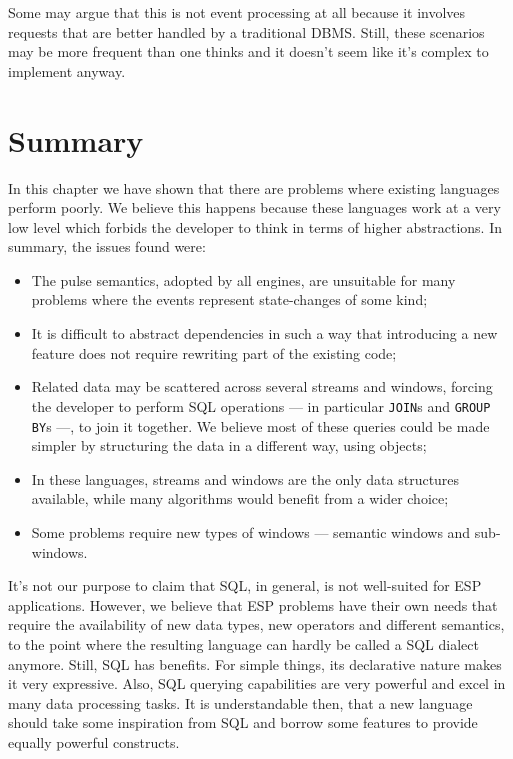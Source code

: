 \documentclass[a4,11pt]{report}
\begin{document}
Some may argue that this is not event processing at all because it
involves requests that are better handled by a traditional
DBMS. Still, these scenarios may be more frequent than one thinks and
it doesn't seem like it's complex to implement anyway.

\section{Summary}

In this chapter we have shown that there are problems where existing
languages perform poorly. We believe this happens because these
languages work at a very low level which forbids the developer to
think in terms of higher abstractions. In summary, the issues found
were:

\begin{itemize}
\item The pulse semantics, adopted by all engines, are unsuitable for
  many problems where the events represent state-changes of some kind;
\item It is difficult to abstract dependencies in such a way that
  introducing a new feature does not require rewriting part of the
  existing code;
\item Related data may be scattered across several streams and
  windows, forcing the developer to perform SQL operations --- in
  particular \verb=JOIN=s and \verb=GROUP BY=s ---, to join it
  together. We believe most of these queries could be made simpler by
  structuring the data in a different way, using objects;
\item In these languages, streams and windows are the only data
  structures available, while many algorithms would benefit from a
  wider choice;
\item Some problems require new types of windows --- semantic windows
  and sub-windows.

\end{itemize}

It's not our purpose to claim that SQL, in general, is not well-suited
for ESP applications. However, we believe that ESP problems have their
own needs that require the availability of new data types, new
operators and different semantics, to the point where the resulting
language can hardly be called a SQL dialect anymore. Still, SQL has
benefits. For simple things, its declarative nature makes it very
expressive. Also, SQL querying capabilities are very powerful and
excel in many data processing tasks. It is understandable then, that a
new language should take some inspiration from SQL and borrow some
features to provide equally powerful constructs.
\end{document}
